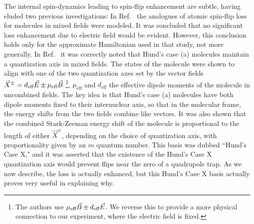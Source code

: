 \documentclass[defaultstyle,11pt]{thesis}
\begin{document}
The internal spin-dynamics leading to spin-flip enhancement are subtle, having eluded two previous investigations:
In Ref.~\cite{Lara2008} the analogues of atomic spin-flip loss for molecules in mixed fields were modeled. 
It was concluded that no significant loss enhancement due to electric field would be evident. However, this conclusion holds only for the approximate Hamiltonian used in that study, not more generally. In Ref.~\cite{Bohn2013} it was correctly noted that Hund's case (a) molecules maintain a quantization axis in mixed fields.
The states of the molecule were shown to align with one of the two quantization axes set by the vector fields $\vec{X}^{\pm}=d_\text{eff}\vec{E} {\nobreak\hspace{.2em}} {\pm}{\nobreak\hspace{.2em}}  \mu_\text{eff}\vec{B}$
\s\footnote{The authors use $\mu_\text{eff}\vec{B} {\nobreak\hspace{.2em}} {\pm}{\nobreak\hspace{.2em}}  d_\text{eff}\vec{E}$. We reverse this to provide a more physical connection to our experiment, where the electric field is fixed.},
$\mu_\text{eff}$ and $d_\text{eff}$ the effective dipole moments of the molecule in uncombined fields.
The key idea is that Hund's case (a) molecules have both dipole moments fixed to their internuclear axis, so that in the molecular frame, the energy shifts from the two fields combine like vectors. 
It was also shown that the combined Stark-Zeeman energy shift of the molecule is proportional to the length of either $\vec{X}^{\pm}$, depending on the choice of quantization axis, with proportionality given by an $m$ quantum number.
This basis was dubbed ``Hund's Case X," and it was asserted that the existence of the Hund's Case X quantization axis would prevent flips near the zero of a quadrupole trap. 
As we now describe, the loss is actually enhanced, but this Hund's Case X basis actually proves very useful in explaining why.
\end{document}
